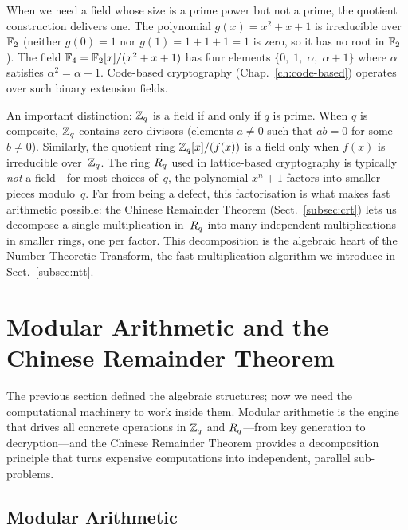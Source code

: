 \begin{example}
\label{ex:f4}
When we need a field whose size is a prime power but not a prime, the quotient construction delivers one.  The polynomial $g(x) = x^2 + x + 1$ is irreducible over $\mathbb{F}_2$ (neither $g(0) = 1$ nor $g(1) = 1 + 1 + 1 = 1$ is zero, so it has no root in $\mathbb{F}_2$).  The field $\mathbb{F}_4 = \mathbb{F}_2[x]/(x^2 + x + 1)$ has four elements $\{0,\; 1,\; \alpha,\; \alpha + 1\}$ where $\alpha$ satisfies $\alpha^2 = \alpha + 1$.  Code-based cryptography (Chap.~\ref{ch:code-based}) operates over such binary extension fields.
\end{example}

An important distinction: $\mathbb{Z}_q$ is a field if and only if $q$ is prime.  When $q$ is composite, $\mathbb{Z}_q$ contains zero divisors (elements $a \neq 0$ such that $ab = 0$ for some $b \neq 0$).  Similarly, the quotient ring $\mathbb{Z}_q[x]/(f(x))$ is a field only when $f(x)$ is irreducible over~$\mathbb{Z}_q$.  The ring $R_q$ used in lattice-based cryptography is typically \emph{not} a field---for most choices of~$q$, the polynomial $x^n + 1$ factors into smaller pieces modulo~$q$.  Far from being a defect, this factorisation is what makes fast arithmetic possible: the Chinese Remainder Theorem (Sect.~\ref{subsec:crt}) lets us decompose a single multiplication in~$R_q$ into many independent multiplications in smaller rings, one per factor.  This decomposition is the algebraic heart of the Number Theoretic Transform, the fast multiplication algorithm we introduce in Sect.~\ref{subsec:ntt}.


\section{Modular Arithmetic and the Chinese Remainder Theorem}
\label{sec:modular}

The previous section defined the algebraic structures; now we need the computational machinery to work inside them.  Modular arithmetic is the engine that drives all concrete operations in $\mathbb{Z}_q$ and $R_q$---from key generation to decryption---and the Chinese Remainder Theorem provides a decomposition principle that turns expensive computations into independent, parallel sub-problems.

\subsection{Modular Arithmetic}
\label{subsec:mod-arith}

